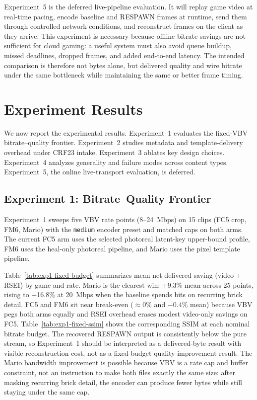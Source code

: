 Experiment~5 is the deferred live-pipeline evaluation.
It will replay game video at real-time pacing, encode baseline and RESPAWN frames at runtime, send them through controlled network conditions, and reconstruct frames on the client as they arrive.
This experiment is necessary because offline bitrate savings are not sufficient for cloud gaming: a useful system must also avoid queue buildup, missed deadlines, dropped frames, and added end-to-end latency.
The intended comparison is therefore not bytes alone, but delivered quality and wire bitrate under the same bottleneck while maintaining the same or better frame timing.

\section{Experiment Results}
\label{sec:ExperimentResults}

We now report the experimental results.
Experiment~1 evaluates the fixed-VBV bitrate--quality frontier.
Experiment~2 studies metadata and template-delivery overhead under CRF23 intake.
Experiment~3 ablates key design choices.
Experiment~4 analyzes generality and failure modes across content types.
Experiment~5, the online live-transport evaluation, is deferred.

\subsection{Experiment 1: Bitrate--Quality Frontier}
\label{sec:exp1}

Experiment~1 sweeps five VBV rate points (8--24~Mbps) on 15 clips (FC5 crop, FM6, Mario) with the \texttt{medium} encoder preset and matched caps on both arms.
The current FC5 arm uses the selected photoreal latent-key upper-bound profile, FM6 uses the heal-only photoreal pipeline, and Mario uses the pixel template pipeline.

Table~\ref{tab:exp1-fixed-budget} summarizes mean net delivered saving (video + RSEI) by game and rate.
Mario is the clearest win: +9.3\% mean across 25 points, rising to +16.8\% at 20~Mbps when the baseline spends bits on recurring brick detail.
FC5 and FM6 sit near break-even ($\approx$0\% and $-0.4\%$ mean) because VBV pegs both arms equally and RSEI overhead erases modest video-only savings on FC5.
Table~\ref{tab:exp1-fixed-ssim} shows the corresponding SSIM at each nominal bitrate budget.
The recovered RESPAWN output is consistently below the pure stream, so Experiment~1 should be interpreted as a delivered-byte result with visible reconstruction cost, not as a fixed-budget quality-improvement result.
The Mario bandwidth improvement is possible because VBV is a rate cap and buffer constraint, not an instruction to make both files exactly the same size: after masking recurring brick detail, the encoder can produce fewer bytes while still staying under the same cap.

